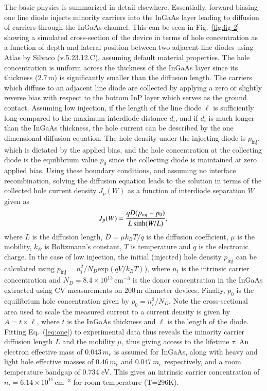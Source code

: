 \documentclass[aip,amsmath,amssymb,reprint]{revtex4-1}
\begin{document}
The basic physics is summarized in detail elsewhere.\cite{Walkerb, Sze} Essentially, forward biasing one line diode injects minority carriers into the InGaAs layer leading to diffusion of carriers through the InGaAs channel. This can be seen in Fig.~\ref{fig:fig-2} showing a simulated cross-section of the device in terms of hole concentration as a function of depth and lateral position between two adjacent line diodes using Atlas by Silvaco (v.5.23.12.C), assuming default material properties.\cite{AtlasUG} The hole concentration is uniform across the thickness of the InGaAs layer since its thickness ($2.7\,$\textmu m) is significantly smaller than the diffusion length.
 The carriers which diffuse to an adjacent line diode are collected by applying a zero or slightly reverse bias with respect to the bottom InP layer which serves as the ground contact. Assuming low injection, if the length of the line diode $\ell$ is sufficiently long compared to the maximum interdiode distance $d_i$, and if $d_i$ is much longer than the InGaAs thickness, the hole current can be described by the one dimensional diffusion equation. The hole density under the injecting diode is $p_{\text{inj}}$, which is dictated by the applied bias, and the hole concentration at the collecting diode is the equilibrium value $p_0$ since the collecting diode is maintained at zero applied bias. Using these boundary conditions, and assuming no interface recombination, solving the diffusion equation leads to the solution in terms of the collected hole current density $J_p(W)$ as a function of interdiode separation $W$ given as\cite{Walkerb,Sze}
%
\begin{equation}
\label{eq:one}
J_p(W) = \frac{qD(p_{\text{inj}}-p_0)}{L\sinh(W/L)}, \\
\end{equation}
%
where $L$ is the diffusion length, $D=\mu k_B T/q$ is the diffusion coefficient, $\mu$ is the mobility, $k_B$ is Boltzmann's constant, $T$ is temperature and $q$ is the electronic charge.
 In the case of low injection, the initial (injected) hole density $p_{\text{inj}}$ can be calculated using $p_{\text{inj}}=n_i^2/N_D\text{exp}\left(qV/k_BT\right)$), where $n_i$ is the intrinsic carrier concentration and $N_D=8.4\times10^{15}\, \text{cm}^{-3}$ is the donor concentration in the InGaAs extracted using CV measurements on $200\,$\textmu m diameter devices.
 Finally, $p_0$ is the equilibrium hole concentration given by $p_0=n_i^2/N_D$.
 Note the cross-sectional area used to scale the measured current to a current density is given by $A=t\times \ell$, where $t$ is the \mbox{InGaAs} thickness and $\ell$ is the length of the diode.
 Fitting Eq.~(\ref{eq:one}) to experimental data thus reveals the minority carrier diffusion length $L$ and the mobility $\mu$, thus giving access to the lifetime $\tau$.
 An electron effective mass of $0.043\,m_e$ is assumed for InGaAs, along with heavy and light hole effective masses of $0.46\,m_e$ and $0.047\,m_e$ respectively, and a room temperature bandgap of 0.734 eV.\cite{Vurgaftman}
 This gives an intrinsic carrier concentration of $n_i=6.14\times10^{11}\, \text{cm}^{-3}$ for room temperature (T=$296$K).
\end{document}
